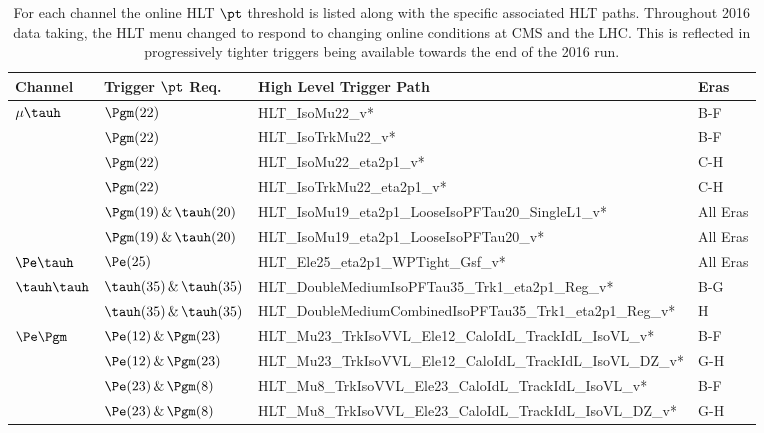 \begin{table}[htbp]
\centering
\begin{footnotesize}
\begin{tabular}{|l|l|l|l|}
\hline
  Channel           &         Trigger $\pt$ Req.              &     High Level Trigger Path  &   Eras  \\
\hline
  $\mu\tauh$       &         $\Pgm(22)$                     &  \scriptsize{HLT\_IsoMu22\_v*} & B-F  \\ 
                   &         $\Pgm(22)$                     &  \scriptsize{HLT\_IsoTrkMu22\_v*} & B-F   \\ 
                   &         $\Pgm(22)$                     &  \scriptsize{HLT\_IsoMu22\_eta2p1\_v*} & C-H  \\
                   &         $\Pgm(22)$                     &  \scriptsize{HLT\_IsoTrkMu22\_eta2p1\_v*} & C-H   \\
                   &         $\Pgm(19)\,\&\,\tauh (20)$     &  \scriptsize{HLT\_IsoMu19\_eta2p1\_LooseIsoPFTau20\_SingleL1\_v*} &  All Eras  \\
                   &         $\Pgm(19)\,\&\,\tauh (20)$     &  \scriptsize{HLT\_IsoMu19\_eta2p1\_LooseIsoPFTau20\_v*} &  All Eras \\
\hline
  $\Pe\tauh$       &         $\Pe (25)$                     &  \scriptsize{HLT\_Ele25\_eta2p1\_WPTight\_Gsf\_v*}   & All Eras \\
\hline
 $\tauh\tauh$      &         $\tauh (35)\,\&\,\tauh (35)$   &  \scriptsize{HLT\_DoubleMediumIsoPFTau35\_Trk1\_eta2p1\_Reg\_v*} & B-G   \\ 
                   &         $\tauh (35)\,\&\,\tauh (35)$   &  \scriptsize{HLT\_DoubleMediumCombinedIsoPFTau35\_Trk1\_eta2p1\_Reg\_v*} & H  \\
\hline
  $\Pe\Pgm$        &         $\Pe(12)\,\&\,\Pgm (23)$       &  \scriptsize{HLT\_Mu23\_TrkIsoVVL\_Ele12\_CaloIdL\_TrackIdL\_IsoVL\_v*} & B-F \\
                   &         $\Pe(12)\,\&\,\Pgm (23)$       &  \scriptsize{HLT\_Mu23\_TrkIsoVVL\_Ele12\_CaloIdL\_TrackIdL\_IsoVL\_DZ\_v*} & G-H  \\
                   &         $\Pe(23)\,\&\,\Pgm (8)$        &  \scriptsize{HLT\_Mu8\_TrkIsoVVL\_Ele23\_CaloIdL\_TrackIdL\_IsoVL\_v*} & B-F  \\
                   &         $\Pe(23)\,\&\,\Pgm (8)$        &  \scriptsize{HLT\_Mu8\_TrkIsoVVL\_Ele23\_CaloIdL\_TrackIdL\_IsoVL\_DZ\_v*} & G-H  \\
\hline
\end{tabular}
\end{footnotesize}
\caption{For each channel the online HLT $\pt$ threshold is listed along with the specific associated
HLT paths. Throughout 2016 data taking, the HLT menu changed to respond to changing online
conditions at CMS and the LHC. This is reflected in progressively tighter triggers
being available towards the end of the 2016 run.
\label{tab:htt_hlt_triggers}
}
\end{table}



